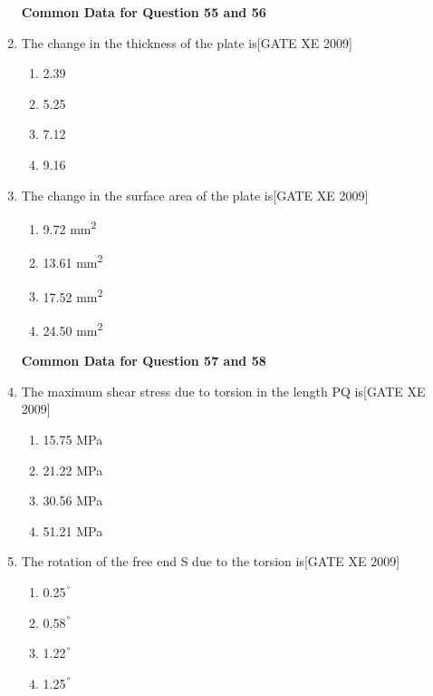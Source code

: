 \documentclass[journal,12pt,onecolumn]{IEEEtran}
\theoremstyle{remark}
\begin{document}
\begin{enumerate}
\textbf{Common Data for Question 55 and 56}
\item The change in the thickness of the plate is\hfill[GATE XE 2009]
\begin{multicols}{2}
\begin{enumerate}
    \item 2.39 
    \item 5.25 
    \item 7.12 
    \item 9.16 
\end{enumerate}
\end{multicols}



\item The change in the surface area of the plate is\hfill[GATE XE 2009]
\begin{multicols}{2}
\begin{enumerate}
    \item 9.72 mm\textsuperscript{2}
    \item 13.61 mm\textsuperscript{2}
    \item 17.52 mm\textsuperscript{2}
    \item 24.50 mm\textsuperscript{2}
\end{enumerate}
\end{multicols}



\textbf{Common Data for Question 57 and 58}

\item The maximum shear stress due to torsion in the length PQ is\hfill[GATE XE 2009]
\begin{multicols}{2}
\begin{enumerate}
    \item 15.75 MPa
    \item 21.22 MPa
    \item 30.56 MPa
    \item 51.21 MPa
\end{enumerate}
\end{multicols}

\item  The rotation of the free end S due to the torsion is\hfill[GATE XE 2009]
\begin{multicols}{2}
\begin{enumerate}
    \item 0.25$^\degree$
    \item 0.58$^\degree$
    \item 1.22$^\degree$
    \item 1.25$^\degree$
\end{enumerate}
\end{multicols}




\end{enumerate}
\end{document}
